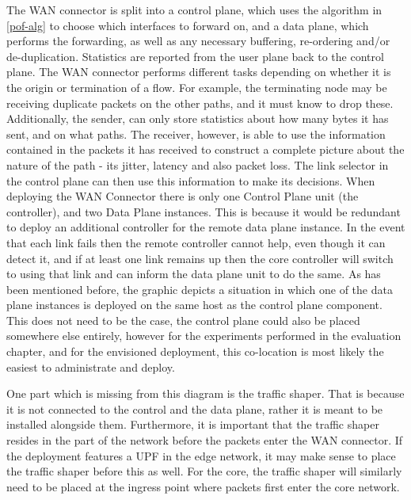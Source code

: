 The WAN connector is split into a control plane, which uses the algorithm in \ref{pof-alg} to choose which interfaces to forward on, and a data plane, which performs the forwarding, as well as any necessary buffering, re-ordering and/or de-duplication. Statistics are reported from the user plane back to the control plane. The WAN connector performs different tasks depending on whether it is the origin or termination of a flow. For example, the terminating node may be receiving duplicate packets on the other paths, and it must know to drop these. Additionally, the sender, can only store statistics about how many bytes it has sent, and on what paths. The receiver, however, is able to use the information contained in the packets it has received to construct a complete picture about the nature of the path - its jitter, latency and also packet loss. The link selector in the control plane can then use this information to make its decisions. When deploying the WAN Connector there is only one Control Plane unit (the controller), and two Data Plane instances. This is because it would be redundant to deploy an additional controller for the remote data plane instance. In the event that each link fails then the remote controller cannot help, even though it can detect it, and if at least one link remains up then the core controller will switch to using that link and can inform the data plane unit to do the same. As has been mentioned before, the graphic depicts a situation in which one of the data plane instances is deployed on the same host as the control plane component. This does not need to be the case, the control plane could also be placed somewhere else entirely, however for the experiments performed in the evaluation chapter, and for the envisioned deployment, this co-location is most likely the easiest to administrate and deploy.

One part which is missing from this diagram is the traffic shaper. That is because it is not connected to the control and the data plane, rather it is meant to be installed alongside them. Furthermore, it is important that the traffic shaper resides in the part of the network before the packets enter the WAN connector. If the deployment features a UPF in the edge network, it may make sense to place the traffic shaper before this as well. For the core, the traffic shaper will similarly need to be placed at the ingress point where packets first enter the core network.



\cleardoublepage
